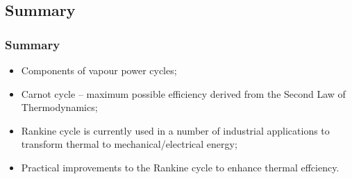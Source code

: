 \documentclass[10pt,compress]{beamer}
\begin{document}
\subsection{Summary}
\begin{frame}
 \frametitle{Summary}
  \begin{itemize}
   \item <1-> Components of vapour power cycles;
   \item <2-> Carnot cycle -- maximum possible efficiency derived from the Second Law of Thermodynamics;
   \item <3-> Rankine cycle is currently used in a number of industrial applications to transform thermal to mechanical/electrical energy;
   \item <4-> Practical improvements to the Rankine cycle to enhance thermal effciency.

  \end{itemize}
\end{frame}


\end{document}
